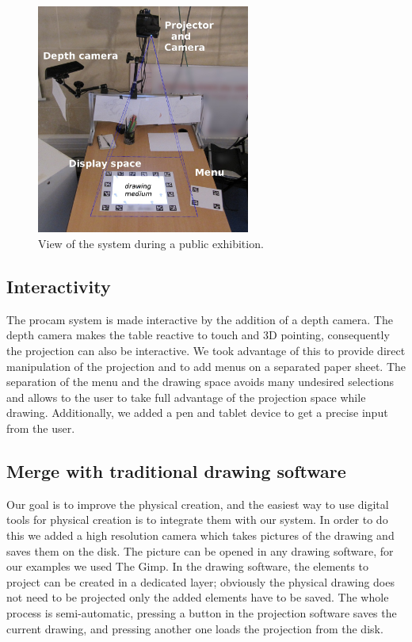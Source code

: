 \documentclass{article}
\begin{document}
\begin{figure}[!b]
\centering \includegraphics[width = 70mm]{global}
\caption{View of the system during a public exhibition.} 
\label{fig:system}
\end{figure}

\subsection{Interactivity}

The procam system is made interactive by the addition of a depth camera. The depth camera makes the table reactive to touch and 3D pointing, consequently the projection can also be interactive. We took advantage of this to provide direct manipulation of the projection and to add menus on a separated paper sheet. The separation of the menu and the drawing space avoids many undesired selections and allows to the user to take full advantage of the projection space while drawing. Additionally, we added a pen and tablet device to get a precise input from the user. 

\subsection{Merge with traditional drawing software}
Our goal is to improve the physical creation, and the easiest way to use digital tools for physical creation is to integrate them with our system. In order to do this we added a high resolution camera which takes pictures of the drawing and saves them on the disk. The picture can be opened in any drawing software, for our examples we used The Gimp. In the drawing software, the elements to project can be created in a dedicated layer; obviously the physical drawing does not need to be projected only the added elements have to be saved. The whole process is semi-automatic, pressing a button in the projection software saves the current drawing, and pressing another one loads the projection from the disk. 
\end{document}

